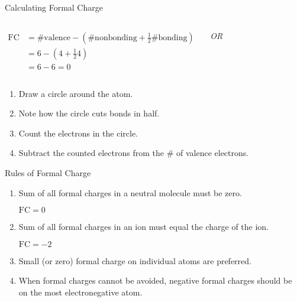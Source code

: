 \documentclass[notes=hide]{beamer}
\begin{document}
\begin{frame}{Calculating Formal Charge}
	\begin{columns}
		\centering
		\centering
		\begin{align*}
			\text{FC} &= \text{\# valence} - \left(\text{\# nonbonding}
			+ \frac{1}{2}\text{\# bonding}\right) \\
			&= 6 - \left(4 + \frac{1}{2}4\right) \\
			&= 6 - 6 = 0
		\end{align*}

		\pause

		\textit{OR}

		\bigskip
	\end{columns}

	\begin{enumerate}
		\item Draw a circle around the atom.
		\item Note how the circle cuts bonds in half.
		\item Count the electrons in the circle.
		\item Subtract the counted electrons from the \# of
			valence electrons.
	\end{enumerate}
\end{frame}

\begin{frame}{Rules of Formal Charge}
	\begin{enumerate}
		\item Sum of all formal charges in a neutral molecule must be
			zero.

			\begin{center}
				 \qquad $\text{FC} = 0$
			\end{center}

		\item Sum of all formal charges in an ion must equal the charge
			of the ion.

			\begin{center}
				 \qquad $\text{FC} = -2$
			\end{center}

		\item Small (or zero) formal charge on individual atoms are
			preferred.

		\item When formal charges cannot be avoided, negative formal
			charges should be on the most electronegative atom.
	\end{enumerate}
\end{frame}
\end{document}
